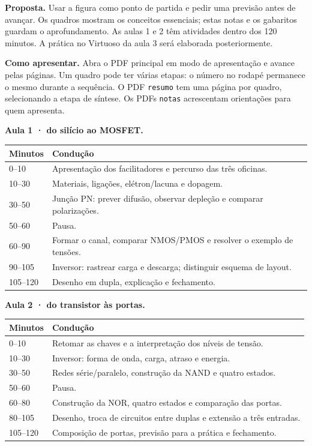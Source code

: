 \documentclass[11pt,a4paper]{article}
\begin{document}
\textbf{Proposta.} Usar a figura como ponto de partida e pedir uma previsão antes de avançar. Os quadros mostram os conceitos essenciais; estas notas e os gabaritos guardam o aprofundamento. As aulas 1 e 2 têm atividades dentro dos 120 minutos. A prática no Virtuoso da aula 3 será elaborada posteriormente.

\textbf{Como apresentar.} Abra o PDF principal em modo de apresentação e avance pelas páginas. Um quadro pode ter várias etapas: o número no rodapé permanece o mesmo durante a sequência. O PDF \texttt{resumo} tem uma página por quadro, selecionando a etapa de síntese. Os PDFs \texttt{notas} acrescentam orientações para quem apresenta.

\textbf{Aula 1 · do silício ao MOSFET.}
\begin{center}\small\begin{tabularx}{\linewidth}{lX}\toprule Minutos & Condução\\\midrule
0--10 & Apresentação dos facilitadores e percurso das três oficinas.\\
10--30 & Materiais, ligações, elétron/lacuna e dopagem.\\
30--50 & Junção PN: prever difusão, observar depleção e comparar polarizações.\\
50--60 & Pausa.\\
60--90 & Formar o canal, comparar NMOS/PMOS e resolver o exemplo de tensões.\\
90--105 & Inversor: rastrear carga e descarga; distinguir esquema de layout.\\
105--120 & Desenho em dupla, explicação e fechamento.\\\bottomrule\end{tabularx}\end{center}
\textbf{Aula 2 · do transistor às portas.}
\begin{center}\small\begin{tabularx}{\linewidth}{lX}\toprule Minutos & Condução\\\midrule
0--10 & Retomar as chaves e a interpretação dos níveis de tensão.\\
10--30 & Inversor: forma de onda, carga, atraso e energia.\\
30--50 & Redes série/paralelo, construção da NAND e quatro estados.\\
50--60 & Pausa.\\
60--80 & Construção da NOR, quatro estados e comparação das portas.\\
80--105 & Desenho, troca de circuitos entre duplas e extensão a três entradas.\\
105--120 & Composição de portas, previsão para a prática e fechamento.\\\bottomrule\end{tabularx}\end{center}
\end{document}

